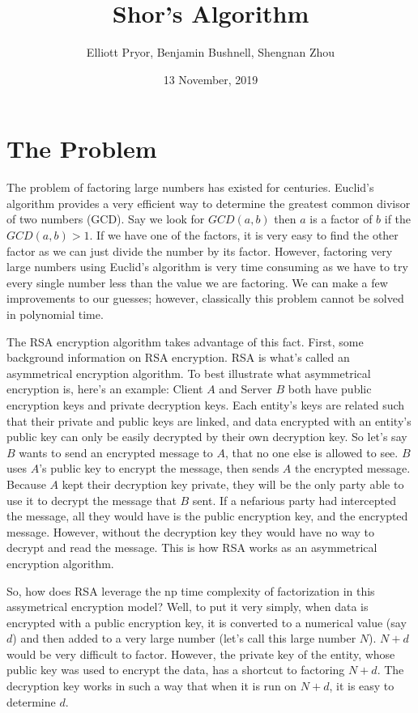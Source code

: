 \documentclass[a4paper]{article}
\title{Shor's Algorithm}
\author{Elliott Pryor, Benjamin Bushnell, Shengnan Zhou}
\date{13 November, 2019}
\begin{document}
\maketitle %
\section{The Problem}
The problem of factoring large numbers has existed for centuries. Euclid's algorithm provides a very efficient way to determine the greatest common divisor of two numbers (GCD). Say we look for $GCD(a,b)$ then $a$ is a factor of $b$ if the $GCD(a, b) > 1$. If we have one of the factors, it is very easy to find the other factor as we can just divide the number by its factor. However, factoring very large numbers using Euclid's algorithm is very time consuming as we have to try every single number less than the value we are factoring. We can make a few improvements to our guesses; however, classically this problem cannot be solved in polynomial time.

The RSA encryption algorithm takes advantage of this fact. First, some background information on RSA encryption. RSA is what's called an asymmetrical encryption algorithm. To best illustrate what asymmetrical encryption is, here's an example: Client $A$ and Server $B$ both have public encryption keys and private decryption keys. Each entity's keys are related such that their private and public keys are linked, and data encrypted with an entity's public key can only be easily decrypted by their own decryption key. So let's say $B$ wants to send an encrypted message to $A$, that no one else is allowed to see. $B$ uses $A$'s public key to encrypt the message, then sends $A$ the encrypted message. Because $A$ kept their decryption key private, they will be the only party able to use it to decrypt the message that $B$ sent. If a nefarious party had intercepted the message, all they would have is the public encryption key, and the encrypted message. However, without the decryption key they would have no way to decrypt and read the message. This is how RSA works as an asymmetrical encryption algorithm.

So, how does RSA leverage the np time complexity of factorization in this assymetrical encryption model? Well, to put it very simply, when data is encrypted with a public encryption key, it is converted to a numerical value (say $d$) and then added to a very large number (let's call this large number $N$). $N+d$ would be very difficult to factor. However, the private key of the entity, whose public key was used to encrypt the data, has a shortcut to factoring $N+d$. The decryption key works in such a way that when it is run on $N + d$, it is easy to determine $d$.
\end{document}
